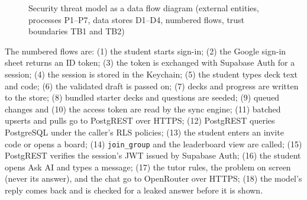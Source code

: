 \documentclass[12pt,letterpaper]{article}
\begin{document}
\begin{figure}[!htbp]
{}
\caption{Security threat model as a data flow diagram (external entities, processes P1--P7, data stores D1--D4, numbered flows, trust boundaries TB1 and TB2)}
\label{fig:dfd}
\end{figure}

The numbered flows are: (1) the student starts sign-in; (2) the Google sign-in sheet
returns an ID token; (3) the token is exchanged with Supabase Auth for a session; (4)
the session is stored in the Keychain; (5) the student types deck text and code; (6)
the validated draft is passed on; (7) decks and progress are written to the store; (8)
bundled starter decks and questions are seeded; (9) queued changes and (10) the access
token are read by the sync engine; (11) batched upserts and pulls go to PostgREST over
HTTPS; (12) PostgREST queries PostgreSQL under the caller's RLS policies; (13) the
student enters an invite code or opens a board; (14) \texttt{join\_group} and the
leaderboard view are called; (15) PostgREST verifies the session's JWT issued by
Supabase Auth; (16) the student opens Ask AI and types a message; (17) the tutor rules,
the problem on screen (never its answer), and the chat go to OpenRouter over HTTPS;
(18) the model's reply comes back and is checked for a leaked answer before it is
shown.
\end{document}

